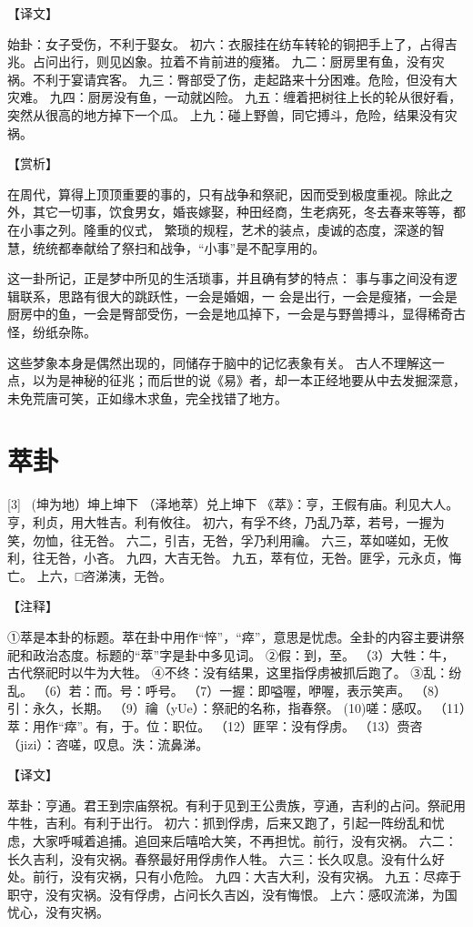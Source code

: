 \documentclass[12pt,UTF8]{ctexbook}
\begin{document}
【译文】

始卦：女子受伤，不利于娶女。
初六：衣服挂在纺车转轮的铜把手上了，占得吉兆。占问出行，则见凶象。拉着不肯前进的瘦猪。
九二：厨房里有鱼，没有灾祸。不利于宴请宾客。
九三：臀部受了伤，走起路来十分困难。危险，但没有大灾难。
九四：厨房没有鱼，一动就凶险。
九五：缠着把树往上长的轮从很好看，突然从很高的地方掉下一个瓜。
上九：碰上野兽，同它搏斗，危险，结果没有灾祸。

【赏析】

在周代，算得上顶顶重要的事的，只有战争和祭祀，因而受到极度重视。除此之外，其它一切事，饮食男女，婚丧嫁娶，种田经商，生老病死，冬去春来等等，都在小事之列。隆重的仪式， 繁琐的规程，艺术的装点，虔诚的态度，深遂的智慧，统统都奉献给了祭扫和战争，“小事”是不配享用的。

这一卦所记，正是梦中所见的生活琐事，并且确有梦的特点： 事与事之间没有逻辑联系，思路有很大的跳跃性，一会是婚姻，一 会是出行，一会是瘦猪，一会是厨房中的鱼，一会是臀部受伤，一会是地瓜掉下，一会是与野兽搏斗，显得稀奇古怪，纷纸杂陈。

这些梦象本身是偶然出现的，同储存于脑中的记忆表象有关。 古人不理解这一点，以为是神秘的征兆；而后世的说《易》者，却一本正经地要从中去发掘深意，未免荒唐可笑，正如缘木求鱼，完全找错了地方。

\chapter{萃卦}
[3] \ (坤为地）坤上坤下
（泽地萃）兑上坤下
《萃》：亨，王假有庙。利见大人。亨，利贞，用大牲吉。利有攸往。
初六，有孚不终，乃乱乃萃，若号，一握为笑，勿恤，往无咎。
六二，引吉，无咎，孚乃利用禴。
六三，萃如嗟如，无攸利，往无咎，小吝。
九四，大吉无咎。
九五，萃有位，无咎。匪孚，元永贞，悔亡。
上六，□咨涕洟，无咎。

【注释】

①萃是本卦的标题。萃在卦中用作“悴”，“瘁”，意思是忧虑。全卦的内容主要讲祭祀和政治态度。标题的“萃”字是卦中多见词。
②假：到，至。
（3）大牲：牛，古代祭祀时以牛为大牲。
④不终：没有结果，这里指俘虏被抓后跑了。
③乱：纷乱。
（6）若：而。号：呼号。
（7）一握：即嗌喔，咿喔，表示笑声。
（8）引：永久，长期。
（9）禴（yUe）：祭祀的名称，指春祭。
(10)嗟：感叹。
（11）萃：用作“瘁”。有，于。位：职位。
（12）匪罕：没有俘虏。
（13）赍咨（jizi）：咨嗟，叹息。泆：流鼻涕。

【译文】

萃卦：亨通。君王到宗庙祭祝。有利于见到王公贵族，亨通，吉利的占问。祭祀用牛牲，吉利。有利于出行。
初六：抓到俘虏，后来又跑了，引起一阵纷乱和忧虑，大家呼喊着追捕。追回来后嘻哈大笑，不再担忧。前行，没有灾祸。
六二：长久吉利，没有灾祸。春祭最好用俘虏作人牲。
六三：长久叹息。没有什么好处。前行，没有灾祸，只有小危险。
九四：大吉大利，没有灾祸。
九五：尽瘁于职守，没有灾祸。没有俘虏，占问长久吉凶，没有悔恨。
上六：感叹流涕，为国忧心，没有灾祸。
\end{document}
